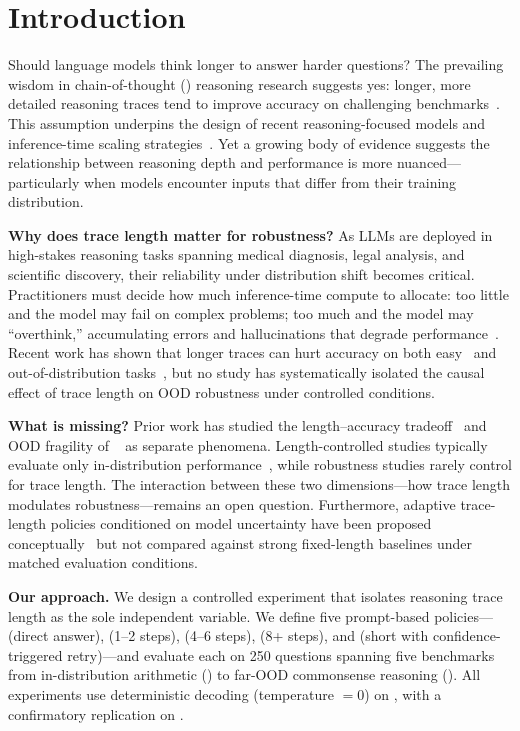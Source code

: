 \section{Introduction}
\label{sec:intro}

Should language models think longer to answer harder questions? The prevailing wisdom in chain-of-thought (\CoT) reasoning research suggests yes: longer, more detailed reasoning traces tend to improve accuracy on challenging benchmarks~\citep{wei2022chainofthought,wang2022selfconsistency}. This assumption underpins the design of recent reasoning-focused models and inference-time scaling strategies~\citep{aggarwal2025l1}. Yet a growing body of evidence suggests the relationship between reasoning depth and performance is more nuanced---particularly when models encounter inputs that differ from their training distribution.

{\bf Why does trace length matter for robustness?} As LLMs are deployed in high-stakes reasoning tasks spanning medical diagnosis, legal analysis, and scientific discovery, their reliability under distribution shift becomes critical. Practitioners must decide how much inference-time compute to allocate: too little and the model may fail on complex problems; too much and the model may ``overthink,'' accumulating errors and hallucinations that degrade performance~\citep{su2025underthinkingoverthinking,shojaee2025illusion}. Recent work has shown that longer \CoT traces can hurt accuracy on both easy~\citep{wu2025whenmoreisless} and out-of-distribution tasks~\citep{li2025mirage}, but no study has systematically isolated the causal effect of trace length on OOD robustness under controlled conditions.

{\bf What is missing?} Prior work has studied the length--accuracy tradeoff~\citep{wu2025whenmoreisless,jin2024impact} and OOD fragility of \CoT~\citep{li2025mirage,wang2024nora} as separate phenomena. Length-controlled studies typically evaluate only in-distribution performance~\citep{aggarwal2025l1,lee2025tokencomplexity}, while robustness studies rarely control for trace length. The interaction between these two dimensions---how trace length modulates robustness---remains an open question. Furthermore, adaptive trace-length policies conditioned on model uncertainty have been proposed conceptually~\citep{zhang2025reasoningbudget} but not compared against strong fixed-length baselines under matched evaluation conditions.

{\bf Our approach.} We design a controlled experiment that isolates reasoning trace length as the sole independent variable. We define five prompt-based policies---\pnone (direct answer), \pshort (1--2 steps), \pmedium (4--6 steps), \plong (8+ steps), and \padaptive (short with confidence-triggered retry)---and evaluate each on 250 questions spanning five benchmarks from in-distribution arithmetic (\gsmk) to far-OOD commonsense reasoning (\csqa). All experiments use deterministic decoding (temperature $= 0$) on \nano, with a confirmatory replication on \mini.

